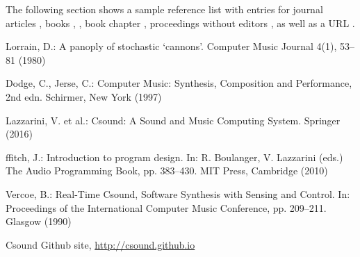 \documentclass[runningheads,a4paper]{llncs}
\begin{document}
The following section shows a sample reference list with entries for
journal articles \cite{jour}, books \cite{book1}, \cite{book2}, book chapter
\cite{chapter}, proceedings without editors \cite{proceeding}, as well as a
URL \cite{url}.

\begin{thebibliography}{4}

 Lorrain, D.: A panoply of stochastic `cannons'. Computer Music Journal 4(1), 53--81 (1980)

 Dodge, C., Jerse, C.: Computer Music: Synthesis, Composition and 
Performance, 2nd edn. Schirmer, New York (1997)

 Lazzarini, V. et al.: Csound: A Sound and Music Computing System.
Springer (2016)

 ffitch, J.: Introduction to program design. In: R. Boulanger,
V. Lazzarini (eds.) The Audio Programming Book, pp. 383--430.
MIT Press, Cambridge (2010)

 Vercoe, B.: Real-Time Csound, Software Synthesis with
Sensing and Control. In: Proceedings of the International Computer Music
Conference, pp. 209--211. Glasgow (1990)

 Csound Github site, \url{http://csound.github.io}


\end{thebibliography}
\end{document}
